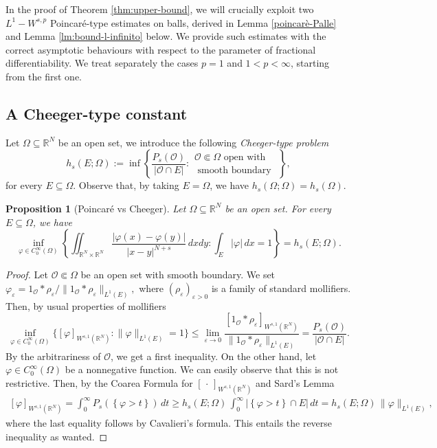 \documentclass{amsart}
\newtheorem{proposition}[theorem]{Proposition}
\theoremstyle{definition}
\numberwithin{equation}{section}
\begin{document}
In the proof of Theorem \ref{thm:upper-bound}, we will crucially exploit two $L^1-W^{s,p}$ Poincar\'e-type estimates on balls, derived in Lemma \ref{poincarè-Palle} and Lemma \ref{lm:bound-l-infinito}  below. We provide such estimates with the correct asymptotic behaviours with respect to the parameter of fractional differentiability. We treat separately the cases $p= 1$ and $1 < p < \infty$, starting from the first one.   

\subsection{A Cheeger-type constant}
Let  $\Omega \subseteq \mathbb{R}^N$ be an open set, we introduce the following {\it Cheeger-type problem}
\[
h_s\left(E; \Omega\right) := \inf \left\{\dfrac{P_s(\mathcal{O})}{\mid \mathcal{O} \cap E|}: \begin{array}{ll}
	\mathcal{O} \Subset \Omega \mbox{ open with } \\ \mbox{ smooth boundary }
\end{array}  \right\},
\]
for every $E \subseteq \Omega$. Observe that, by taking $E = \Omega$, we have $h_s(\Omega; \Omega) = h_s(\Omega)$. 
\begin{proposition}[Poincar\'e vs Cheeger] \label{Cheeger--type constant}
	Let  $\Omega \subseteq \mathbb{R}^N$ be an open set. For every $E \subseteq \Omega$, we have
	\begin{equation*}
		\inf_{\varphi \in C^\infty_0(\Omega)}\left\{\iint_{\mathbb{R}^N \times \mathbb{R}^N} \frac{|\varphi(x) - \varphi(y)|}{|x-y|^{N + s}}\,dxdy : \int_{E} |\varphi|\,dx = 1\right\} = h_s\left(E; \Omega\right).
	\end{equation*}
\end{proposition}
\begin{proof}
	Let $\mathcal{O} \Subset \Omega$ be an open set with smooth boundary. We set $\varphi_{\varepsilon} = 1_{\mathcal{O}} \ast \rho_\varepsilon/\|1_{\mathcal{O}} \ast \rho_{\varepsilon}\|_{L^1(E)},$ where $(\rho_\varepsilon)_{\varepsilon > 0}$ is a family of standard mollifiers. Then, by usual properties of mollifiers 
	\[
	\inf_{\varphi \in C^\infty_0(\Omega)}\Big\{ [\varphi]_{W^{s,1}(\mathbb{R}^N)} : \|\varphi\|_{L^1(E)} = 1 \Big\}  \le \lim_{\varepsilon \rightarrow 0}  \dfrac{[1_{\mathcal{O}} \ast \rho_{\varepsilon}]_{W^{s,1}(\mathbb{R}^N)}}{\|1_{\mathcal{O}} \ast \rho_{\varepsilon}\|_{L^1(E)}} = \dfrac{P_s(\mathcal{O})}{|\mathcal{O} \cap E |}.
	\]
	By the arbitrariness of $\mathcal{O}$, we get a first inequality. On the other hand, let $\varphi \in C^\infty_0(\Omega)$ be a nonnegative function. We can easily observe that this is not restrictive. Then, by the Coarea Formula for $[\,\cdot\,]_{W^{s,1}(\mathbb{R}^N)}$ and Sard's Lemma
	\[
	\begin{split}
		[\varphi]_{W^{s,1}(\mathbb{R}^N)} = \int_0^\infty P_s\left(\left\{\varphi > t\right\}\right)\,dt \ge h_s\left(E; \Omega\right)\,\int_0^\infty |\left\{\varphi > t\right\} \cap E|\,dt = h_s\left(E; \Omega\right)\,\|\varphi\|_{L^1(E)},
	\end{split}
	\]
	where the last equality follows by Cavalieri's formula. This entails the reverse inequality as wanted. 
\end{proof}
\end{document}
